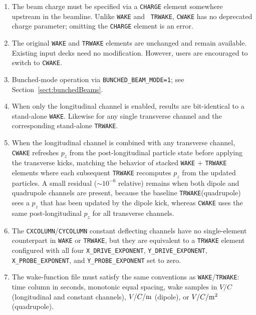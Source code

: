 \begin{enumerate}
\item The beam charge must be specified via a {\tt CHARGE} element
  somewhere upstream in the beamline.  Unlike {\tt WAKE} and {\tt
  TRWAKE}, {\tt CWAKE} has no deprecated charge parameter; omitting
  the {\tt CHARGE} element is an error.
\item The original {\tt WAKE} and {\tt TRWAKE} elements are unchanged
  and remain available.  Existing input decks need no modification.
  However, users are encouraged to switch to \verb|CWAKE|.
\item Bunched-mode operation via {\tt BUNCHED\_BEAM\_MODE=1}; see
  Section~\ref{sect:bunchedBeams}.
\item When only the longitudinal channel is enabled, results are
  bit-identical to a stand-alone {\tt WAKE}.  Likewise for any single
  transverse channel and the corresponding stand-alone {\tt TRWAKE}.
\item When the longitudinal channel is combined with any transverse
  channel, {\tt CWAKE} refreshes $p_z$ from the post-longitudinal
  particle state before applying the transverse kicks, matching the
  behavior of stacked {\tt WAKE} $+$ {\tt TRWAKE} elements where each
  subsequent {\tt TRWAKE} recomputes $p_z$ from the updated particles.
  A small residual ($\sim 10^{-6}$ relative) remains when both
  dipole and quadrupole channels are present, because the baseline
  {\tt TRWAKE}(quadrupole) sees a $p_z$ that has been updated by
  the dipole kick, whereas {\tt CWAKE} uses the same post-longitudinal
  $p_z$ for all transverse channels.
\item The {\tt CXCOLUMN}/{\tt CYCOLUMN} constant deflecting channels
  have no single-element counterpart in {\tt WAKE} or {\tt TRWAKE},
  but they are equivalent to a {\tt TRWAKE} element configured with
  all four {\tt X\_DRIVE\_EXPONENT}, {\tt Y\_DRIVE\_EXPONENT},
  {\tt X\_PROBE\_EXPONENT}, and {\tt Y\_PROBE\_EXPONENT} set to zero.
\item The wake-function file must satisfy the same conventions as
  {\tt WAKE}/{\tt TRWAKE}: time column in seconds, monotonic equal
  spacing, wake samples in $V/C$ (longitudinal and constant
  channels), $V/C/{\rm m}$ (dipole), or $V/C/{\rm m}^2$ (quadrupole).
\end{enumerate}
